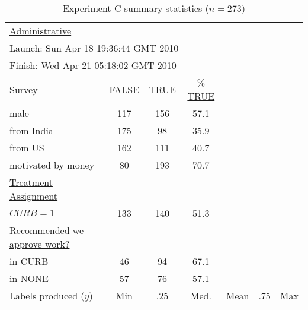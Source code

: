 \documentclass[12pt]{article}
\begin{document}
\begin{table}[h!]
  \begin{center}
   \caption{Experiment C summary statistics ($n=273$)\label{tab:ExpC.ss}}
\begin{tabular}{lcccccc}
  \toprule 
 \underline{Administrative} \\
  \multicolumn{4}{l}{\hspace{10pt} Launch:   Sun Apr 18 19:36:44 GMT 2010} \\
  \multicolumn{4}{l}{\hspace{10pt} Finish:   Wed Apr 21 05:18:02 GMT 2010} \\[5pt]
  \underline{Survey}    & \underline{FALSE} & \underline{TRUE} & \underline{\% TRUE}   \\
  \hspace{10pt} male                  & 117 & 156 & 57.1  \\
  \hspace{10pt} from India                 & 175 & 98 & 35.9  \\
  \hspace{10pt} from US                    & 162 & 111 & 40.7  \\
  \hspace{10pt} motivated by money                 & 80 & 193 & 70.7  \\[5pt]
  \underline{Treatment Assignment} \\ 
  \hspace{10pt} $CURB=1$                & 133 & 140 & 51.3  \\[5pt]
 
 \underline{Recommended we approve work?}   \\
  \hspace{10pt} in CURB           & 46 & 94 & 67.1\\
  \hspace{10pt} in NONE          & 57 & 76 & 57.1\\[5pt]
  
  \underline{Labels produced ($y$)} &  \underline{Min} & \underline{.25} & \underline{Med.} & \underline{Mean} & \underline{.75} & \underline{Max}\\ 
 

\end{tabular}
\end{center}
\end{table}
\end{document}
